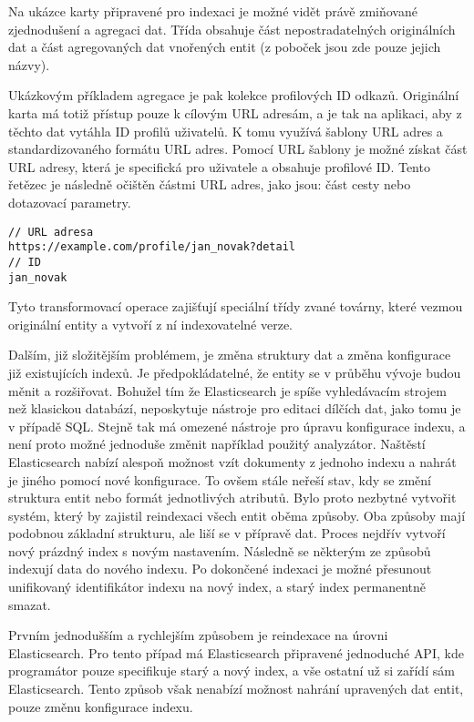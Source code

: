 		Na ukázce karty připravené pro indexaci je možné vidět právě zmiňované zjednodušení a agregaci dat.
		Třída obsahuje část nepostradatelných originálních dat a část agregovaných dat vnořených entit (z poboček jsou
		zde pouze jejich názvy).

		Ukázkovým příkladem agregace je pak kolekce profilových ID odkazů.
		Originální karta má totiž přístup pouze k cílovým \ac{URL} adresám, a je tak na aplikaci, aby z těchto dat
		vytáhla ID profilů uživatelů.
		K tomu využívá šablony \ac{URL} adres a standardizovaného formátu \ac{URL} adres.
		Pomocí \ac{URL} šablony je možné získat část \ac{URL} adresy, která je specifická pro uživatele a obsahuje profilové ID.
		Tento řetězec je následně očištěn částmi \ac{URL} adres, jako jsou: část cesty nebo dotazovací parametry.

		\begin{lstlisting}[caption={Ukázka transformace URL adresy na profilové ID. Zdroj: [autor]}]
// URL adresa
https://example.com/profile/jan_novak?detail
// ID
jan_novak
		\end{lstlisting}

		Tyto transformovací operace zajišťují speciální třídy zvané továrny, které vezmou originální entity a vytvoří
		z ní indexovatelné verze.

		Dalším, již složitějším problémem, je změna struktury dat a změna konfigurace již existujících indexů.
		Je předpokládatelné, že entity se v průběhu vývoje budou měnit a rozšiřovat.
		Bohužel tím že Elasticsearch je spíše vyhledávacím strojem než klasickou databází, neposkytuje nástroje pro editaci
		dílčích dat, jako tomu je v případě \ac{SQL}.
		Stejně tak má omezené nástroje pro úpravu konfigurace indexu, a není proto možné jednoduše změnit například
		použitý analyzátor.
		Naštěstí Elasticsearch nabízí alespoň možnost vzít dokumenty z jednoho indexu a nahrát je jiného pomocí nové
		konfigurace.
		To ovšem stále neřeší stav, kdy se změní struktura entit nebo formát jednotlivých atributů.
		Bylo proto nezbytné vytvořit systém, který by zajistil reindexaci všech entit oběma způsoby.
		Oba způsoby mají podobnou základní strukturu, ale liší se v přípravě dat.
		Proces nejdřív vytvoří nový prázdný index s novým nastavením.
		Následně se některým ze způsobů indexují data do nového indexu.
		Po dokončené indexaci je možné přesunout unifikovaný identifikátor indexu na nový index, a starý index permanentně
		smazat.

		Prvním jednodušším a rychlejším způsobem je reindexace na úrovni Elasticsearch.
		Pro tento případ má Elasticsearch připravené jednoduché \ac{API}, kde programátor pouze specifikuje starý a nový
		index, a vše ostatní už si zařídí sám Elasticsearch.
		Tento způsob však nenabízí možnost nahrání upravených dat entit, pouze změnu konfigurace indexu.

